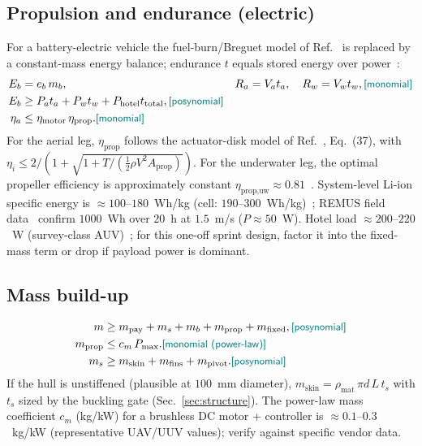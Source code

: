 \documentclass{new-aiaa}
\newcommand{\gpc}[1]{\textcolor{teal}{\small\textsf{[#1]}}} %
\begin{document}
\subsection{Propulsion and endurance (electric)}
For a battery-electric vehicle the fuel-burn/Breguet model of Ref.~\cite{hoburg2014geometric} is
replaced by a constant-mass energy balance; endurance $t$ equals stored energy over
power~\cite{allen2000propulsion,rutherford2008southampton,lin2026energies}:
\begin{align}
E_b   &= e_b\, m_b,                  & R_a   &= V_a t_a,\quad R_w = V_w t_w, \gpc{monomial}\\
E_b   &\ge P_a t_a + P_w t_w + P_{\text{hotel}}t_{\text{total}}, \gpc{posynomial}\\
\eta_a&\le \eta_{\text{motor}}\,\eta_{\text{prop}}. \gpc{monomial}
\end{align}
For the aerial leg, $\eta_{\text{prop}}$ follows the actuator-disk model of
Ref.~\cite{hoburg2014geometric}, Eq.~(37), with $\eta_i\le 2/(1+\sqrt{1+T/(\frac12\rho V^2
A_{\text{prop}})})$. For the underwater leg, the optimal propeller efficiency is approximately
constant $\eta_{\text{prop,uw}}\approx0.81$~\cite{allen2000propulsion}. System-level Li-ion
specific energy is $\approx100$--$180$~Wh/kg (cell: $190$--$300$~Wh/kg)~\cite{lin2026energies};
REMUS field data~\cite{allen2000propulsion} confirm $1000$~Wh over $20$~h at $1.5$~m/s ($P
\approx50$~W). Hotel load $\approx 200$--$220$~W (survey-class AUV)~\cite{lin2026energies}; for
this one-off sprint design, factor it into the fixed-mass term or drop if payload power is
dominant.

\subsection{Mass build-up}
\begin{align}
m &\ge m_{\text{pay}} + m_s + m_b + m_{\text{prop}} + m_{\text{fixed}}, \gpc{posynomial}\\
m_{\text{prop}} &\le c_m\,P_{\max}. \gpc{monomial (power-law)}\\
m_s &\ge m_{\text{skin}} + m_{\text{fins}} + m_{\text{pivot}}. \gpc{posynomial}
\end{align}
If the hull is unstiffened (plausible at $100$~mm diameter), $m_{\text{skin}} = \rho_{\text{mat}}\,\pi
d\,L\,t_s$ with $t_s$ sized by the buckling gate (Sec.~\ref{sec:structure}). The power-law mass
coefficient $c_m$ (kg/kW) for a brushless DC motor + controller is $\approx 0.1$--$0.3$~kg/kW
(representative UAV/UUV values); verify against specific vendor data.
\end{document}
